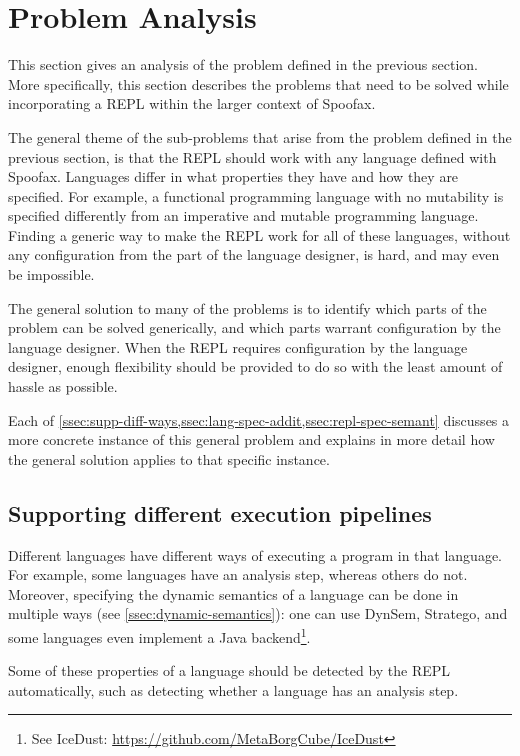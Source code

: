\section{Problem Analysis}
\label{sec:problem-analysis}
This section gives an analysis of the problem defined in the previous
section. More specifically, this section describes the problems that
need to be solved while incorporating a REPL within the larger context of Spoofax.

The general theme of the sub-problems that arise from the problem
defined in the previous section, is that the REPL should work
with any language defined with Spoofax. Languages differ in what
properties they have and how they are specified. For example, a
functional programming language with no mutability is specified
differently from an imperative and mutable programming
language. Finding a generic way to make the REPL work for all of these
languages, without any configuration from the part of the language
designer, is hard, and may even be impossible.

The general solution to many of the problems is to identify which
parts of the problem can be solved generically, and which parts
warrant configuration by the language designer. When the REPL requires
configuration by the language designer, enough flexibility should be provided
to do so with the least amount of hassle as possible.

Each of \cref{ssec:supp-diff-ways,ssec:lang-spec-addit,ssec:repl-spec-semant}
discusses a more concrete instance of this general problem and
explains in more detail how the general solution applies to that
specific instance.

\subsection{Supporting different execution pipelines}
\label{ssec:supp-diff-ways}
Different languages have different ways of executing a program in that
language. For example, some languages have an analysis step, whereas
others do not. Moreover, specifying the dynamic semantics of a language
can be done in multiple ways (see \cref{ssec:dynamic-semantics}): one
can use DynSem, Stratego, and some languages even implement a Java
backend\footnote{See IceDust:
  \url{https://github.com/MetaBorgCube/IceDust}}.

Some of these properties of a language should be detected by the REPL
automatically, such as detecting whether a language has an analysis
step.

